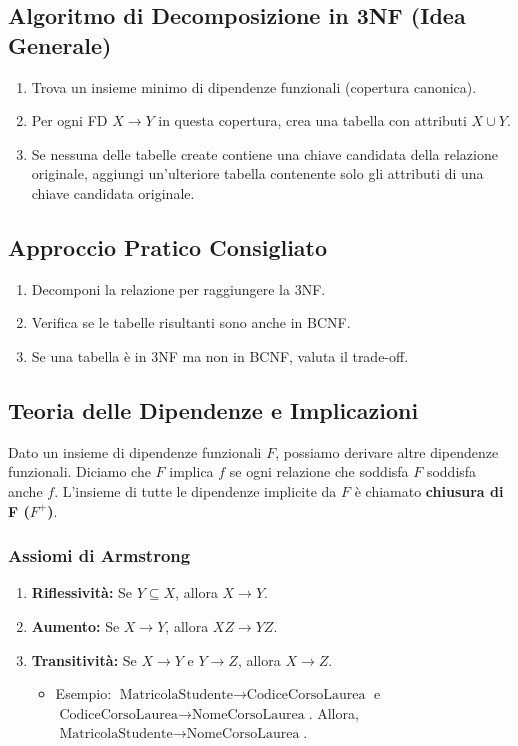 \documentclass{article}
\begin{document}
	\subsection{Algoritmo di Decomposizione in 3NF (Idea Generale)}
	\begin{enumerate}
		\item Trova un insieme minimo di dipendenze funzionali (copertura canonica).
		\item Per ogni FD $X \rightarrow Y$ in questa copertura, crea una tabella con attributi $X \cup Y$.
		\item Se nessuna delle tabelle create contiene una chiave candidata della relazione originale, aggiungi un'ulteriore tabella contenente solo gli attributi di una chiave candidata originale.
	\end{enumerate}
	
	\subsection{Approccio Pratico Consigliato}
	\begin{enumerate}
		\item Decomponi la relazione per raggiungere la 3NF.
		\item Verifica se le tabelle risultanti sono anche in BCNF.
		\item Se una tabella è in 3NF ma non in BCNF, valuta il trade-off.
	\end{enumerate}
	
	\subsection{Teoria delle Dipendenze e Implicazioni}
	Dato un insieme di dipendenze funzionali $F$, possiamo derivare altre dipendenze funzionali. Diciamo che $F$ implica $f$ se ogni relazione che soddisfa $F$ soddisfa anche $f$. L'insieme di tutte le dipendenze implicite da $F$ è chiamato \textbf{chiusura di F ($F^+$)}.
	
	\subsubsection{Assiomi di Armstrong}
	\begin{enumerate}
		\item \textbf{Riflessività:} Se $Y \subseteq X$, allora $X \rightarrow Y$.
		\item \textbf{Aumento:} Se $X \rightarrow Y$, allora $XZ \rightarrow YZ$.
		\item \textbf{Transitività:} Se $X \rightarrow Y$ e $Y \rightarrow Z$, allora $X \rightarrow Z$.
		\begin{itemize}
			\item Esempio: $\text{MatricolaStudente} \rightarrow \text{CodiceCorsoLaurea}$ e $\text{CodiceCorsoLaurea} \rightarrow \text{NomeCorsoLaurea}$. Allora, $\text{MatricolaStudente} \rightarrow \text{NomeCorsoLaurea}$.
		\end{itemize}
	\end{enumerate}
	
\end{document}
